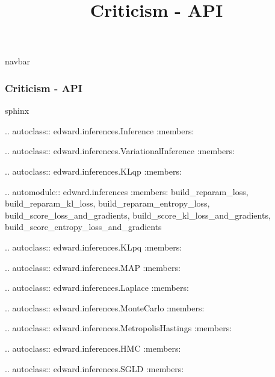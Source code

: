 \title{Criticism - API}

{{navbar}}

\subsubsection{Criticism - API}

{{sphinx

.. autoclass:: edward.inferences.Inference
   :members:

.. autoclass:: edward.inferences.VariationalInference
   :members:

.. autoclass:: edward.inferences.KLqp
   :members:

.. automodule:: edward.inferences
   :members: build_reparam_loss,
             build_reparam_kl_loss,
             build_reparam_entropy_loss,
             build_score_loss_and_gradients,
             build_score_kl_loss_and_gradients,
             build_score_entropy_loss_and_gradients

.. autoclass:: edward.inferences.KLpq
   :members:

.. autoclass:: edward.inferences.MAP
   :members:

.. autoclass:: edward.inferences.Laplace
   :members:

.. autoclass:: edward.inferences.MonteCarlo
   :members:

.. autoclass:: edward.inferences.MetropolisHastings
   :members:

.. autoclass:: edward.inferences.HMC
   :members:

.. autoclass:: edward.inferences.SGLD
   :members:


}}
